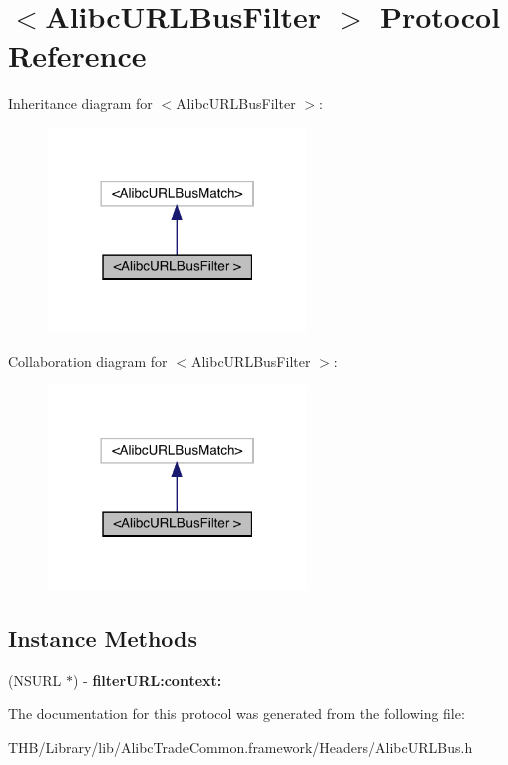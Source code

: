 \hypertarget{protocol_alibc_u_r_l_bus_filter_01-p}{}\section{$<$Alibc\+U\+R\+L\+Bus\+Filter $>$ Protocol Reference}
\label{protocol_alibc_u_r_l_bus_filter_01-p}


Inheritance diagram for $<$Alibc\+U\+R\+L\+Bus\+Filter $>$\+:\nopagebreak
\begin{figure}[H]
\begin{center}
\leavevmode
\includegraphics[width=194pt]{protocol_alibc_u_r_l_bus_filter_01-p__inherit__graph}
\end{center}
\end{figure}


Collaboration diagram for $<$Alibc\+U\+R\+L\+Bus\+Filter $>$\+:\nopagebreak
\begin{figure}[H]
\begin{center}
\leavevmode
\includegraphics[width=194pt]{protocol_alibc_u_r_l_bus_filter_01-p__coll__graph}
\end{center}
\end{figure}
\subsection*{Instance Methods}
\begin{DoxyCompactItemize}
\item 
\mbox{\label{protocol_alibc_u_r_l_bus_filter_01-p_a557c8776ba54ca1c205ed60b0f6c0ac9}} 
(N\+S\+U\+RL $\ast$) -\/ {\bfseries filter\+U\+R\+L\+:context\+:}
\end{DoxyCompactItemize}


The documentation for this protocol was generated from the following file\+:\begin{DoxyCompactItemize}
\item 
T\+H\+B/\+Library/lib/\+Alibc\+Trade\+Common.\+framework/\+Headers/Alibc\+U\+R\+L\+Bus.\+h\end{DoxyCompactItemize}
